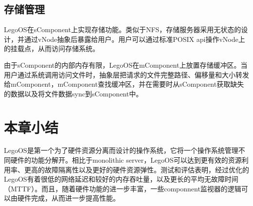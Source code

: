
\subsection{存储管理}

LegoOS在sComponent上实现存储功能。类似于NFS，存储服务器采用无状态的设计，并通过vNode抽象后暴露给用户。用户可以通过标准POSIX api操作vNode上的挂载点，从而访问存储系统。

由于sComponent的内部内存有限，LegoOS在mComponent上放置存储缓冲区。当用户通过系统调用访问文件时，抽象层把请求的文件完整路径、偏移量和大小转发给mComponent，mComponent查找缓冲区，并在需要时从sComponent获取缺失的数据以及将文件数据sync到sComponent中。


\section{本章小结}

LegoOS是第一个为了硬件资源分离而设计的操作系统，它将一个操作系统管理不同硬件的功能分解开。相比于monolithic server，LegoOS可以达到更有效的资源利用率、更高的故障隔离性以及更好的硬件资源弹性。测试和评估表明，经过优化的LegoOS有着很低的网络延迟和较好的内存吞吐量，以及更长的平均无故障时间（MTTF）。而且，随着硬件功能的进一步丰富，一些componnent监视器的逻辑可以由硬件完成，从而进一步提高性能。
